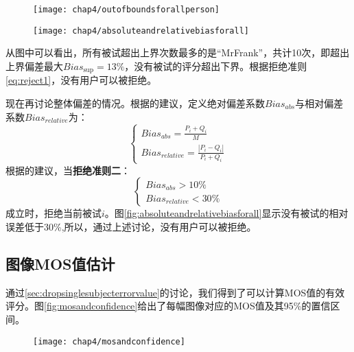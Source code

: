 \begin{figure}[!hbp]
  \centering
  \begin{minipage}[b]{0.49\textwidth}
    \captionstyle{\centering}
    \centering
    \texttt{[image: chap4/outofboundsforallperson]}
  \end{minipage} %
  \hfill
  \begin{minipage}[b]{0.49\textwidth}
    \captionstyle{\centering}
    \centering
    \texttt{[image: chap4/absoluteandrelativebiasforall]}
  \end{minipage}     
\end{figure}

从图中可以看出，所有被试超出上界次数最多的是“MrFrank”，共计10次，即超出上界偏差最大$Bia{s_{\sup }}=13\%$，没有被试的评分超出下界。根据拒绝准则\ref{eq:reject1}，没有用户可以被拒绝。

现在再讨论整体偏差的情况。根据\parencite{recommendation2002500}的建议，定义绝对偏差系数$Bia{s_{abs }}$与相对偏差系数$Bia{s_{relative }}$为：
\begin{equation}
\label{eq:absrelativebias}
\left\{ \begin{array}{l}
Bia{s_{abs}} = \frac{{{P_i} + {Q_i}}}{M}\\
Bia{s_{relative}} = \frac{{\left| {{P_i} - {Q_i}} \right|}}{{{P_i} + {Q_i}}}
\end{array} \right.
\end{equation}
根据\parencite{recommendation2002500}的建议，当\textbf{拒绝准则二}：
\begin{equation}
\label{eq:reject2}
\left\{ \begin{array}{l}
Bia{s_{abs}} > 10\% \\
Bia{s_{relative}} < 30\% 
\end{array} \right.
\end{equation}
成立时，拒绝当前被试$i$。图\ref{fig:absoluteandrelativebiasforall}显示没有被试的相对误差低于30\%,所以，通过上述讨论，没有用户可以被拒绝。
\subsection{图像MOS值估计}
\label{sec:mosevaluation}
通过\ref{sec:dropsinglesubjecterrorvalue}的讨论，我们得到了可以计算MOS值的有效评分。图\ref{fig:mosandconfidence}给出了每幅图像对应的MOS值及其95\%的置信区间。
\begin{figure}[ht]
  \centering
  \texttt{[image: chap4/mosandconfidence]}
\end{figure}

